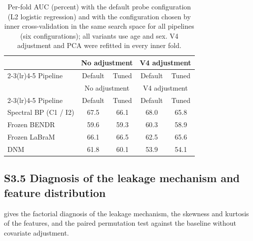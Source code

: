 {\scriptsize
\setlength{\tabcolsep}{4pt}
\begin{longtable}{p{}cccc}
\caption{Per-fold AUC (percent) with the default probe configuration (L2 logistic regression) and with the configuration chosen by inner cross-validation in the same search space for all pipelines (six configurations); all variants use age and sex. V4 adjustment and PCA were refitted in every inner fold.}\label{tab:anggaran}\\
\toprule
 & \multicolumn{2}{c}{No adjustment} & \multicolumn{2}{c}{V4 adjustment} \\
\cmidrule(lr){2-3}\cmidrule(lr){4-5}
Pipeline & Default & Tuned & Default & Tuned \\
\midrule
\endfirsthead
\toprule
 & \multicolumn{2}{c}{No adjustment} & \multicolumn{2}{c}{V4 adjustment} \\
\cmidrule(lr){2-3}\cmidrule(lr){4-5}
Pipeline & Default & Tuned & Default & Tuned \\
\midrule
\endhead
\bottomrule
\endfoot
Spectral BP (C1 / I2) & 67.5 & 66.1 & 68.0 & 65.8 \\
Frozen BENDR & 59.6 & 59.3 & 60.3 & 58.9 \\
Frozen LaBraM & 66.1 & 66.5 & 62.5 & 65.6 \\
DNM & 61.8 & 60.1 & 53.9 & 54.1 \\
\end{longtable}
}\clearpage

\subsection*{S3.5 Diagnosis of the leakage mechanism and feature distribution}
 gives the factorial diagnosis of the leakage mechanism,  the skewness and kurtosis of the features, and  the paired permutation test against the baseline without covariate adjustment.

